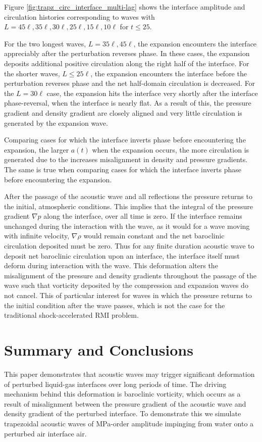 \documentclass{article}
\begin{document}
Figure \ref{fig:trapz_circ_interface_multi-lag} shows the interface
amplitude and circulation histories corresponding to waves with
$L=45\ell, 35\ell ,30\ell ,25\ell ,15\ell ,10\ell$
for $t\leq 25$.

For the two longest waves, $L=35\ell, 45\ell$, the expansion
encounters the interface appreciably after the perturbation reverses
phase. In these cases, the expansion deposits additional positive
circulation along the right half of the interface. For the shorter
waves, $L \leq 25\ell$, the expansion encounters the interface
before the perturbation reverses phase and the net half-domain
circulation is decreased. For the $L=30\ell$ case, the expansion
hits the interface very shortly after the interface phase-reversal,
when the interface is nearly flat. As a result of this, the pressure
gradient and density gradient are closely aligned and very little
circulation is generated by the expansion wave.

Comparing cases for which the interface inverts phase before
encountering the expansion, the larger $a(t)$ when the expansion
occurs, the more circulation is generated due to the increases
misalignment in density and pressure gradients. The same is true when
comparing cases for which the interface inverts phase before
encountering the expansion.

After the passage of the acoustic wave and all reflections the
pressure returns to the initial, atmospheric conditions. This implies
that the integral of the pressure gradient $\nabla p$ along the
interface, over all time is zero. If the interface remains unchanged
during the interaction with the wave, as it would for a wave moving
with infinite velocity, $\nabla \rho$ would remain constant and the
net baroclinic circulation deposited must be zero. Thus for any finite
duration acoustic wave to deposit net baroclinic circulation upon an
interface, the interface itself must deform during interaction with
the wave. This deformation alters the misalignment of the pressure and
density gradients throughout the passage of the wave such that
vorticity deposited by the compression and expansion waves do not
cancel. This of particular interest for waves in which the pressure
returns to the initial condition after the wave passes, which is not
the case for the traditional shock-accelerated \ac{RMI} problem.

%
\section{Summary and Conclusions}
\label{sec:conclusions}
This paper demonstrates that acoustic waves may trigger significant
deformation of perturbed liquid-gas interfaces over long periods of
time. The driving mechanism behind this deformation is baroclinic
vorticity, which occurs as a result of misalignment between the
pressure gradient of the acoustic wave and density gradient of the
perturbed interface. To demonstrate this we simulate trapezoidal
acoustic waves of MPa-order amplitude impinging from water onto a
perturbed air interface air.
\end{document}
